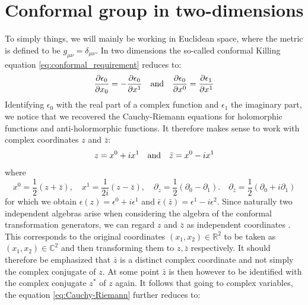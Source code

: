 \documentclass[11pt, a4paper, oneside]{book}
\theoremstyle{definition} %
\begin{document}
\section{Conformal group in two-dimensions}
To simply things, we will mainly be working in Euclidean space, where the metric is defined to be $g_{\mu \nu} = \delta_{\mu\nu}$. In two dimensions the so-called conformal Killing equation \ref{eq:conformal_requirement} reduces to:
\begin{equation}
	\pdv{\epsilon_0}{x_0} = -\pdv{\epsilon_0}{x^1} \qq{and} \pdv{\epsilon_0}{x^0} = \pdv{\epsilon_1}{x^1}
	\label{eq:Cauchy-Riemann}
\end{equation}
Identifying $\epsilon_0$ with the real part of a complex function and $\epsilon_1$ the imaginary part, we notice that we recovered the Cauchy-Riemann equations for holomorphic functions and anti-holormorphic functions. It therefore makes sense to work with complex coordinates $z$ and $\bar{z}$:
\begin{align}
	z = x^0 + ix^1 \qq{and} \bar{z} = x^0 - ix^1 
\end{align}
where 
\begin{equation}
	x^0 = \frac{1}{2}(z + \bar{z}),\quad x^1 = \frac{1}{2i}(z - \bar{z}), \quad \partial_z = \frac{1}{2}(\partial_0 - \partial_1). \quad \partial_{\bar{z}} = \frac{1}{2}(\partial_0 + i\partial_1)
\end{equation}
for which we obtain $\epsilon(z) = \epsilon^0 + i\epsilon^1$ and $\bar{\epsilon}(\bar{z}) = \epsilon^1 - i\epsilon^2$. Since naturally two independent algebras arise when considering the algebra of the conformal transformation generators, we can regard $z$ and $\bar{z}$ as independent coordinates \cite{Schellekens}. This corresponds to the original coordinates $(x_1,x_2) \in \mathbb{R}^2$ to be taken as $(x_1, x_2) \in \mathbb{C}^2$ and then transforming them to $z, \bar{z}$ respectively. It should therefore be emphasized that $\bar{z}$ is a distinct complex coordinate and not simply the complex conjugate of $z$. At some point $\bar{z}$ is then however to be identified with the complex conjugate $z^*$ of $z$ again. It follows that going to complex variables, the equation \ref{eq:Cauchy-Riemann} further reduces to:
\end{document}
